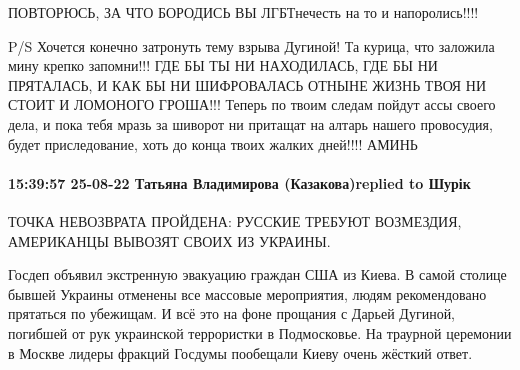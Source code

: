 ПОВТОРЮСЬ, ЗА ЧТО БОРОДИСЬ ВЫ ЛГБТнечесть на то и напоролись!!!!

P/S Хочется конечно затронуть тему взрыва Дугиной! Та курица, что заложила мину крепко запомни!!! ГДЕ БЫ ТЫ НИ НАХОДИЛАСЬ, ГДЕ БЫ НИ ПРЯТАЛАСЬ, И КАК БЫ НИ ШИФРОВАЛАСЬ ОТНЫНЕ ЖИЗНЬ ТВОЯ НИ СТОИТ И ЛОМОНОГО ГРОША!!! Теперь по твоим следам пойдут ассы своего дела, и пока тебя мразь за шиворот ни притащат на алтарь нашего провосудия, будет приследование, хоть до конца твоих жалких дней!!!! АМИНЬ

\paragraph{15:39:57 25-08-22 Татьяна Владимирова (Казакова)replied to Шурік}

ТОЧКА НЕВОЗВРАТА ПРОЙДЕНА: РУССКИЕ ТРЕБУЮТ ВОЗМЕЗДИЯ, АМЕРИКАНЦЫ ВЫВОЗЯТ СВОИХ
ИЗ УКРАИНЫ.

Госдеп объявил экстренную эвакуацию граждан США из Киева. В самой столице
бывшей Украины отменены все массовые мероприятия, людям рекомендовано прятаться
по убежищам. И всё это на фоне прощания с Дарьей Дугиной, погибшей от рук
украинской террористки в Подмосковье. На траурной церемонии в Москве лидеры
фракций Госдумы пообещали Киеву очень жёсткий ответ.
